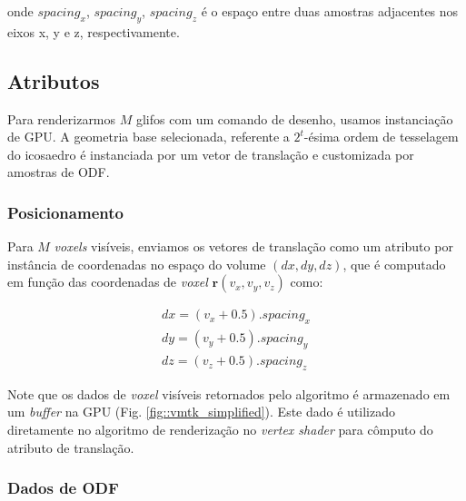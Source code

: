 onde $spacing_x$, $spacing_y$, $spacing_z$ é o espaço entre duas amostras adjacentes nos eixos x, y e z, respectivamente.






\subsection{Atributos}
\label{ssec::atributos}



Para renderizarmos $M$ glifos com um comando de desenho, usamos instanciação de GPU. A geometria base selecionada, referente a $2^t$-ésima ordem de tesselagem do icosaedro é instanciada por um vetor de translação e customizada por amostras de ODF.

\subsubsection{Posicionamento}

Para $M$ \textit{voxels} visíveis, enviamos os vetores de translação como um atributo por instância de coordenadas no espaço do volume $(dx, dy, dz)$, que é computado em função das coordenadas de \textit{voxel} $\mathbf{r}(v_x, v_y, v_z)$ como:

\begin{align}
 \label{eq::translation}
    dx = (v_x + 0.5).spacing_x \nonumber\\
    dy = (v_y + 0.5).spacing_y \\
    dz = (v_z + 0.5).spacing_z \nonumber
\end{align}

Note que os dados de \textit{voxel} visíveis retornados pelo algoritmo é armazenado em um \textit{buffer} na GPU (Fig. \ref{fig::vmtk_simplified}). Este dado é utilizado diretamente no algoritmo de renderização no \textit{vertex shader} para cômputo do atributo de translação.

\subsubsection{Dados de ODF}
\label{sssec::dados_de_odf}

